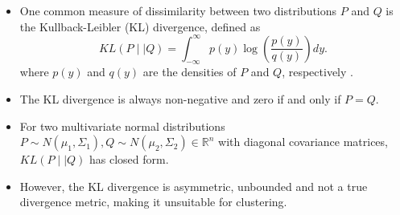 \documentclass{article}
\numberwithin{equation}{section}
\begin{document}
\begin{itemize} 
  \item One common measure of dissimilarity between two distributions $P$ and $Q$ is the Kullback-Leibler (KL) divergence, defined as
    \begin{equation} \label{eq:kl}
      KL(P \mid\mid Q) = \int_{-\infty}^{\infty} p(y) \log\left(\frac{p(y)}{q(y)}\right) dy.
    \end{equation}
    where $p(y)$ and $q(y)$ are the densities of $P$ and $Q$, respectively \citep{Kullback1951}.
  \item The KL divergence is always non-negative and zero if and only if $P = Q$.
  \item For two multivariate normal distributions $P \sim N(\mu_1, \Sigma_1), Q \sim N(\mu_2, \Sigma_2) \in \mathbb{R}^n$ with diagonal covariance matrices, $KL(P \mid\mid Q)$ has closed form.
  \item However, the KL divergence is asymmetric, unbounded and not a true divergence metric, making it unsuitable for clustering.
\end{itemize}
\vspace{1cm}
\end{document}
